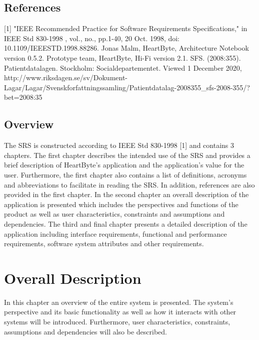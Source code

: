 \documentclass{scrreprt}
\begin{document}
\section{References}
[1] "IEEE Recommended Practice for Software Requirements Specifications," in IEEE Std 830-1998 , vol., no., pp.1-40, 20 Oct. 1998, doi: 10.1109/IEEESTD.1998.88286.
\newline
\newline
[2] Jonas Malm, HeartByte, Architecture Notebook version 0.5.2.
\newline
\newline
[3] Prototype team, HeartByte, Hi-Fi version 2.1. 
\newline
\newline
[4] SFS. (2008:355). Patientdatalagen. Stockholm: Socialdepartementet. Viewed 1 December 2020, http://www.riksdagen.se/sv/Dokument-Lagar/Lagar/Svenskforfattningssamling/Patientdatalag-2008355_sfs-2008-355/?bet=2008:35

\section{Overview}
The SRS is constructed according to IEEE Std 830-1998 [1] and contains 3 chapters. The first chapter describes the intended use of the SRS and provides a brief description of HeartByte’s application and the application’s value for the user. Furthermore, the first chapter also contains a list of definitions, acronyms and abbreviations to facilitate in reading the SRS. In addition, references are also provided in the first chapter. In the second chapter an overall description of the application is presented which includes the perspectives and functions of the product as well as user characteristics, constraints and assumptions and dependencies. The third and final chapter presents a detailed description of the application including interface requirements, functional and performance requirements, software system attributes and other requirements. 

\chapter{Overall Description}
In this chapter an overview of the entire system is presented. The system's perspective and its basic functionality as well as how it interacts with other systems will be introduced. Furthermore, user characteristics, constraints, assumptions and dependencies will also be described.
\end{document}
